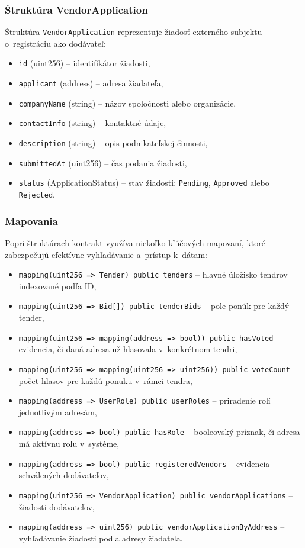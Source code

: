 \subsubsection{Štruktúra VendorApplication}

Štruktúra \texttt{VendorApplication} reprezentuje žiadosť externého subjektu
o~registráciu ako dodávateľ:
\begin{itemize}
    \item \texttt{id} (uint256) -- identifikátor žiadosti,
    \item \texttt{applicant} (address) -- adresa žiadateľa,
    \item \texttt{companyName} (string) -- názov spoločnosti alebo organizácie,
    \item \texttt{contactInfo} (string) -- kontaktné údaje,
    \item \texttt{description} (string) -- opis podnikateľskej činnosti,
    \item \texttt{submittedAt} (uint256) -- čas podania žiadosti,
    \item \texttt{status} (ApplicationStatus) -- stav žiadosti:
    \texttt{Pending}, \texttt{Approved} alebo \texttt{Rejected}.
\end{itemize}

\subsubsection{Mapovania}

Popri štruktúrach kontrakt využíva niekoľko kľúčových mapovaní, ktoré
zabezpečujú efektívne vyhľadávanie a~prístup k~dátam:
\begin{itemize}
    \item \texttt{mapping(uint256 => Tender) public tenders} -- hlavné
    úložisko tendrov indexované podľa ID,
    \item \texttt{mapping(uint256 => Bid[]) public tenderBids} -- pole
    ponúk pre každý tender,
    \item \texttt{mapping(uint256 => mapping(address => bool)) public hasVoted}
    -- evidencia, či daná adresa už hlasovala v~konkrétnom tendri,
    \item \texttt{mapping(uint256 => mapping(uint256 => uint256)) public
    voteCount} -- počet hlasov pre každú ponuku v~rámci tendra,
    \item \texttt{mapping(address => UserRole) public userRoles} -- priradenie
    rolí jednotlivým adresám,
    \item \texttt{mapping(address => bool) public hasRole} -- booleovský
    príznak, či adresa má aktívnu rolu v~systéme,
    \item \texttt{mapping(address => bool) public registeredVendors} --
    evidencia schválených dodávateľov,
    \item \texttt{mapping(uint256 => VendorApplication) public
    vendorApplications} -- žiadosti dodávateľov,
    \item \texttt{mapping(address => uint256) public
    vendorApplicationByAddress} -- vyhľadávanie žiadosti podľa adresy
    žiadateľa.
\end{itemize}


